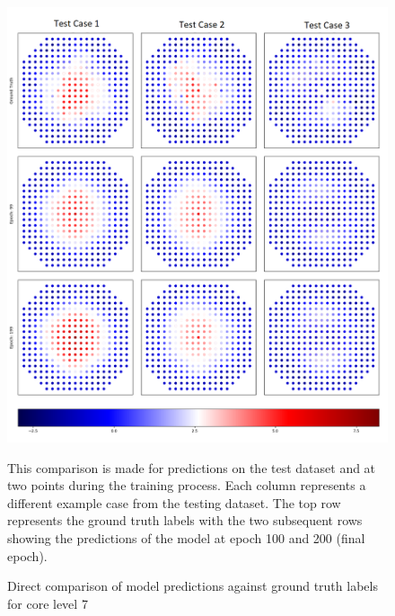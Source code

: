 \begin{figure}[p]
	\centering
	\includegraphics[scale=0.45]{Figures/preds_layer_7.png}
	\caption{Direct comparison of model predictions against ground truth labels for core level 7} {This comparison is made for predictions on the test dataset and at two points during the training process. Each column represents a different example case from the testing dataset. The top row represents the ground truth labels with the two subsequent rows showing the predictions of the model at epoch 100 and 200 (final epoch). }
	\label{fig:preds_layer_7}
\end{figure}

